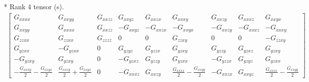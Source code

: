 \documentclass[fleqn,8pt,landscape]{jsarticle}
\begin{document}
* Rank 4 tensor (s).
\begin{align*}
\begin{bmatrix} G_{xxxx} & G_{xxyy} & G_{xxzz} & G_{xxyz} & G_{xxzx} & G_{xxxy} & G_{xxzy} & G_{xxxz} & G_{xxyx} \\ G_{xxyy} & G_{xxxx} & G_{xxzz} & - G_{xxyz} & - G_{xxzx} & - G_{xxyx} & - G_{xxzy} & - G_{xxxz} & - G_{xxxy} \\ G_{zzxx} & G_{zzxx} & G_{zzzz} & 0 & 0 & G_{zzxy} & 0 & 0 & - G_{zzxy} \\ G_{yzxx} & - G_{yzxx} & 0 & G_{yzyz} & G_{yzzx} & G_{yzxy} & G_{yzzy} & G_{yzxz} & G_{yzxy} \\ - G_{yzxy} & G_{yzxy} & 0 & - G_{yzxz} & G_{yzzy} & G_{yzxx} & - G_{yzzx} & G_{yzyz} & G_{yzxx} \\ - \frac{G_{xxxy}}{2} - \frac{G_{xxyx}}{2} & \frac{G_{xxxy}}{2} + \frac{G_{xxyx}}{2} & 0 & - G_{xxxz} & G_{xxzy} & \frac{G_{xxxx}}{2} - \frac{G_{xxyy}}{2} & - G_{xxzx} & G_{xxyz} & \frac{G_{xxxx}}{2} - \frac{G_{xxyy}}{2} \end{bmatrix}
\end{align*}
\end{document}
